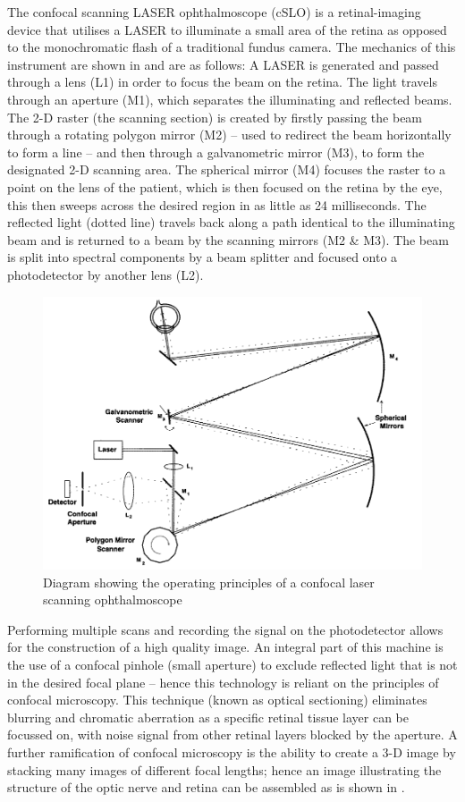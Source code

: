 The confocal scanning LASER ophthalmoscope (cSLO) is a retinal-imaging device that utilises a LASER to illuminate a small area of the retina as opposed to the monochromatic flash of a traditional fundus camera. The mechanics of this instrument are shown in and are as follows: A LASER is generated and passed through a lens (L1) in order to focus the beam on the retina. The light travels through an aperture (M1), which separates the illuminating and reflected beams. The 2-D raster (the scanning section) is created by firstly passing the beam through a rotating polygon mirror (M2) – used to redirect the beam horizontally to form a line – and then through a galvanometric mirror (M3), to form the designated 2-D scanning area. The spherical mirror (M4) focuses the raster to a point on the lens of the patient, which is then focused on the retina by the eye, this then sweeps across the desired region in as little as 24 milliseconds. The reflected light (dotted line) travels back along a path identical to the illuminating beam and is returned to a beam by the scanning mirrors (M2 \& M3). The beam is split into spectral components by a beam splitter and focused onto a photodetector by another lens (L2).

\begin{figure}[htbp]
\centering
 \includegraphics{figures/cslo}
\caption{Diagram showing the operating principles of a confocal laser scanning ophthalmoscope}
\label{fig:cslo}
\end{figure}


Performing multiple scans and recording the signal on the photodetector allows for the construction of a high quality image. An integral part of this machine is the use of a confocal pinhole (small aperture) to exclude reflected light that is not in the desired focal plane – hence this technology is reliant on the principles of confocal microscopy. This technique (known as optical sectioning) eliminates blurring and chromatic aberration as a specific retinal tissue layer can be focussed on, with noise signal from other retinal layers blocked by the aperture. A further ramification of confocal microscopy is the ability to create a 3-D image by stacking many images of different focal lengths; hence an image illustrating the structure of the optic nerve and retina can be assembled as is shown in .

